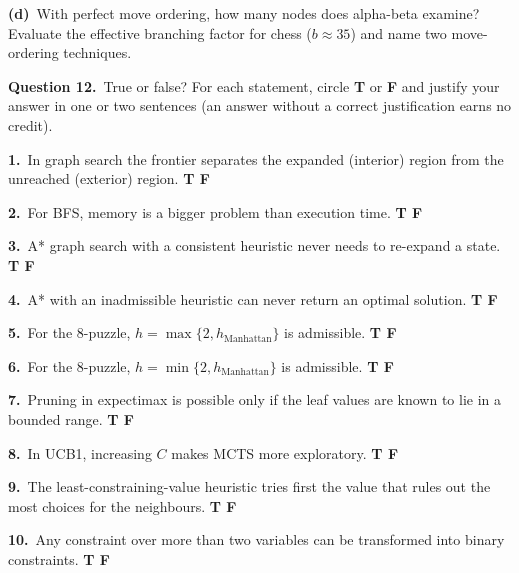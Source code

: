 \documentclass[11pt,a4paper]{article}
\newcommand{\question}[1]{\par\medskip\noindent\textbf{Question #1.}\ }
\newcommand{\subq}[1]{\par\smallskip\noindent\textbf{#1}\ }
\begin{document}
\begin{ansbox}[height=1.8cm]\end{ansbox}
\subq{(d)}With perfect move ordering, how many nodes does alpha-beta examine? Evaluate the effective branching factor for chess ($b\approx35$) and name two move-ordering techniques.
\begin{ansbox}[height=1.6cm]\end{ansbox}
\question{12}True or false?
For each statement, circle \textbf{T} or \textbf{F} and justify your answer in one or two sentences (an answer without a correct justification earns no credit).
\subq{1.}In graph search the frontier separates the expanded (interior) region from the unreached (exterior) region. \hfill \textbf{T \quad F}
\begin{ansbox}[height=1.5cm]\end{ansbox}
\subq{2.}For BFS, memory is a bigger problem than execution time. \hfill \textbf{T \quad F}
\begin{ansbox}[height=1.5cm]\end{ansbox}
\subq{3.}A* graph search with a consistent heuristic never needs to re-expand a state. \hfill \textbf{T \quad F}
\begin{ansbox}[height=1.5cm]\end{ansbox}
\subq{4.}A* with an inadmissible heuristic can never return an optimal solution. \hfill \textbf{T \quad F}
\begin{ansbox}[height=1.5cm]\end{ansbox}
\subq{5.}For the 8-puzzle, $h=\max\{2,h_{\text{Manhattan}}\}$ is admissible. \hfill \textbf{T \quad F}
\begin{ansbox}[height=1.5cm]\end{ansbox}
\subq{6.}For the 8-puzzle, $h=\min\{2,h_{\text{Manhattan}}\}$ is admissible. \hfill \textbf{T \quad F}
\begin{ansbox}[height=1.5cm]\end{ansbox}
\subq{7.}Pruning in expectimax is possible only if the leaf values are known to lie in a bounded range. \hfill \textbf{T \quad F}
\begin{ansbox}[height=1.5cm]\end{ansbox}
\subq{8.}In UCB1, increasing $C$ makes MCTS more exploratory. \hfill \textbf{T \quad F}
\begin{ansbox}[height=1.5cm]\end{ansbox}
\subq{9.}The least-constraining-value heuristic tries first the value that rules out the most choices for the neighbours. \hfill \textbf{T \quad F}
\begin{ansbox}[height=1.5cm]\end{ansbox}
\subq{10.}Any constraint over more than two variables can be transformed into binary constraints. \hfill \textbf{T \quad F}
\begin{ansbox}[height=1.5cm]\end{ansbox}
\end{document}
